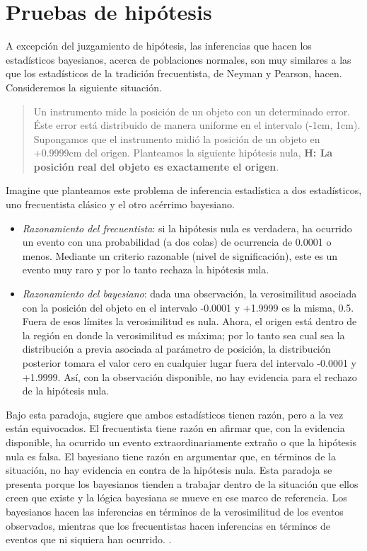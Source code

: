 \documentclass[
  10pt,
  spanish,
]{book}
\providecommand{\tightlist}{%
  \setlength{\itemsep}{0pt}\setlength{\parskip}{0pt}}
\theoremstyle{definition}
\theoremstyle{definition}
\theoremstyle{definition}
\theoremstyle{definition}
\theoremstyle{remark}
\begin{document}
\hypertarget{pruebas-de-hipuxf3tesis}{%
\section{Pruebas de hipótesis}\label{pruebas-de-hipuxf3tesis}}

A excepción del juzgamiento de hipótesis, las inferencias que hacen los
estadísticos bayesianos, acerca de poblaciones normales, son muy
similares a las que los estadísticos de la tradición frecuentista, de
Neyman y Pearson, hacen. Consideremos la siguiente situación.

\begin{quote}
Un instrumento mide la posición de un objeto con un determinado error. Éste
error está distribuido de manera uniforme en el intervalo (-1cm, 1cm).
Supongamos que el instrumento midió la posición de un objeto en
+0.9999cm del origen. Planteamos la siguiente hipótesis nula, \textbf{H: La
posición real del objeto es exactamente el origen}.
\end{quote}

Imagine que planteamos este problema de inferencia estadística a dos estadísticos, uno frecuentista clásico y el otro acérrimo bayesiano.

\begin{itemize}
\tightlist
\item
  \emph{Razonamiento del frecuentista}: si la hipótesis nula es verdadera, ha ocurrido un
  evento con una probabilidad (a dos colas) de ocurrencia de 0.0001 o
  menos. Mediante un criterio razonable (nivel de significación), este es
  un evento muy raro y por lo tanto rechaza la hipótesis nula.
\item
  \emph{Razonamiento del bayesiano}: dada una
  observación, la verosimilitud asociada con la posición del objeto en el
  intervalo -0.0001 y +1.9999 es la misma, 0.5. Fuera de esos límites la
  verosimilitud es nula. Ahora, el origen está dentro de la región en
  donde la verosimilitud es máxima; por lo tanto sea cual sea la
  distribución a previa asociada al parámetro de posición, la distribución
  posterior tomara el valor cero en cualquier lugar fuera del intervalo
  -0.0001 y +1.9999. Así, con la observación disponible, no hay evidencia
  para el rechazo de la hipótesis nula.
\end{itemize}

Bajo esta paradoja, \citet{Brewer2002} sugiere que
ambos estadísticos tienen razón, pero a la vez están equivocados. El
frecuentista tiene razón en afirmar que, con la evidencia disponible, ha
ocurrido un evento extraordinariamente extraño o que la hipótesis nula
es falsa. El bayesiano tiene razón en argumentar que, en términos de la
situación, no hay evidencia en contra de la hipótesis nula. Esta
paradoja se presenta porque los bayesianos tienden a trabajar dentro de
la situación que ellos creen que existe y la lógica bayesiana se mueve en ese marco de
referencia. Los bayesianos hacen las inferencias en términos de la
verosimilitud de los eventos observados, mientras que los frecuentistas
hacen inferencias en términos de eventos que ni siquiera han ocurrido. .
\end{document}
